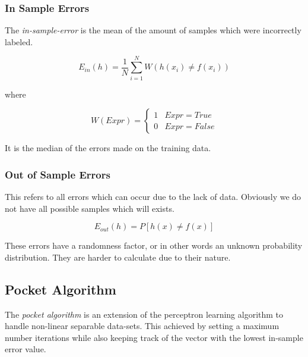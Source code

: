\subsubsection{In Sample Errors}

The \emph{in-sample-error} is the mean of the amount of samples which were incorrectly labeled. 

\[
    E_{in} (h) = \frac{1}{N} \sum_{i = 1}^{N} W(h(x_i) \neq f(x_i))
\]

where

\[
    W(Expr) = \begin{cases}
        1 & Expr = True \\ 
        0 & Expr = False
    \end{cases}
\]

It is the median of the errors made on the training data. 

\subsubsection{Out of Sample Errors}

This refers to all errors which can occur due to the lack of data. Obviously we do not 
have all possible samples which will exists.

\[
    E_{out} (h) = P[h(x) \neq f(x)]
\]

These errors have a randomness factor, or in other words an unknown probability distribution.
They are harder to calculate due to their nature. 

\subsection{Pocket Algorithm}

The \emph{pocket algorithm} is an extension of the perceptron learning algorithm to handle non-linear separable data-sets. This 
achieved by setting a maximum number iterations while also keeping track of the vector with the lowest in-sample error value. 

